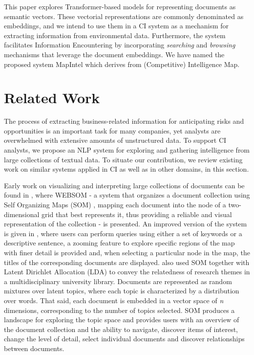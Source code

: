 \documentclass[a4paper]{article}
\begin{document}
This paper explores Transformer-based models for representing documents as semantic vectors. These vectorial representations are commonly denominated as embeddings, and we intend to use them in a CI system as a mechanism for extracting information from environmental data. Furthermore, the system facilitates Information Encountering by incorporating \emph{searching} and \emph{browsing} mechanisms that leverage the document embeddings. We have named the proposed system MapIntel which derives from (Competitive) Intelligence Map.

\section{Related Work}
The process of extracting business-related information for anticipating risks and opportunities is an important task for many companies, yet analysts are overwhelmed with extensive amounts of unstructured data. To support CI analysts, we propose an NLP system for exploring and gathering intelligence from large collections of textual data. To situate our contribution, we review existing work on similar systems applied in CI as well as in other domains, in this section.

Early work on visualizing and interpreting large collections of documents can be found in \citet{kaski1998}, where WEBSOM - a system that organizes a document collection using Self Organizing Maps (SOM) \citep{Kohonen1982}, mapping each document into the node of a two-dimensional grid that best represents it, thus providing a reliable and visual representation of the collection - is presented. An improved version of the system is given in \citet{kohonen2013}, where users can perform queries using either a set of keywords or a descriptive sentence, a zooming feature to explore specific regions of the map with finer detail is provided and, when selecting a particular node in the map, the titles of the corresponding documents are displayed. \citet{lafia2019} also used SOM together with Latent Dirichlet Allocation (LDA) \citep{blei2003} to convey the relatedness of research themes in a multidisciplinary university library. Documents are represented as random mixtures over latent topics, where each topic is characterized by a distribution over words. That said, each document is embedded in a vector space of \emph{n} dimensions, corresponding to the number of topics selected. SOM produces a landscape for exploring the topic space and provides users with an overview of the document collection and the ability to navigate, discover items of interest, change the level of detail, select individual documents and discover relationships between documents.
\end{document}
